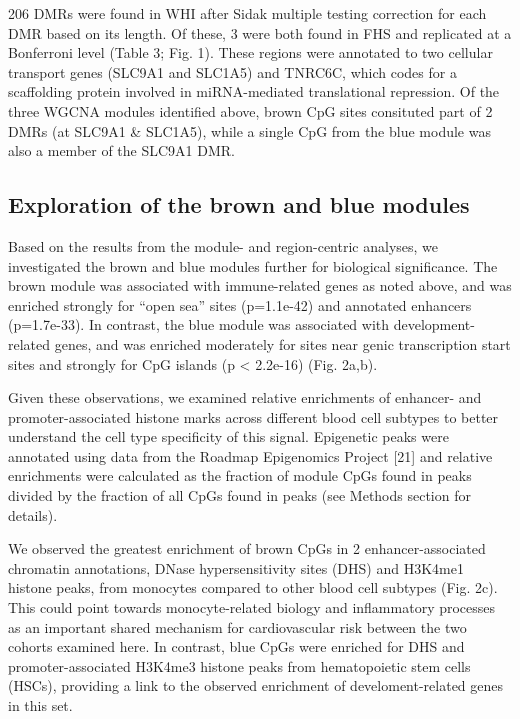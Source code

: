 \documentclass[]{bmcart}
\theoremstyle{definition}
\theoremstyle{definition}
\theoremstyle{definition}
\theoremstyle{remark}
\begin{document}
206 DMRs were found in WHI after Sidak multiple testing correction for
each DMR based on its length. Of these, 3 were both found in FHS and
replicated at a Bonferroni level (Table 3; Fig. 1). These regions were
annotated to two cellular transport genes (SLC9A1 and SLC1A5) and
TNRC6C, which codes for a scaffolding protein involved in miRNA-mediated
translational repression. Of the three WGCNA modules identified above,
brown CpG sites consituted part of 2 DMRs (at SLC9A1 \& SLC1A5), while
a single CpG from the blue module was also a member of the SLC9A1 DMR.

\subsection{Exploration of the brown and blue
modules}\label{exploration-of-the-brown-and-blue-modules}

Based on the results from the module- and region-centric analyses, we
investigated the brown and blue modules further for biological
significance. The brown module was associated with immune-related genes
as noted above, and was enriched strongly for ``open sea'' sites
(p=1.1e-42) and annotated enhancers (p=1.7e-33). In contrast, the blue
module was associated with development-related genes, and was enriched
moderately for sites near genic transcription start sites and strongly
for CpG islands (p \textless{} 2.2e-16) (Fig. 2a,b).

Given these observations, we examined relative enrichments of enhancer-
and promoter-associated histone marks across different blood cell
subtypes to better understand the cell type specificity of this signal.
Epigenetic peaks were annotated using data from the Roadmap Epigenomics
Project {[}21{]} and relative enrichments were calculated as the
fraction of module CpGs found in peaks divided by the fraction of all
CpGs found in peaks (see Methods section for details).

We observed the greatest enrichment of brown CpGs in 2
enhancer-associated chromatin annotations, DNase hypersensitivity sites
(DHS) and H3K4me1 histone peaks, from monocytes compared to other blood
cell subtypes (Fig. 2c). This could point towards monocyte-related
biology and inflammatory processes as an important shared mechanism for
cardiovascular risk between the two cohorts examined here. In contrast,
blue CpGs were enriched for DHS and promoter-associated H3K4me3 histone
peaks from hematopoietic stem cells (HSCs), providing a link to the
observed enrichment of develoment-related genes in this set.
\end{document}
